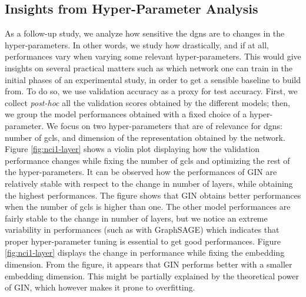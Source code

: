 \subsection{Insights from Hyper-Parameter Analysis}
As a follow-up study, we analyze how sensitive the \glspl{dgn} are to changes in the hyper-parameters. In other words, we study how drastically, and if at all, performances vary when varying some relevant hyper-parameters. This would give insights on several practical matters such as which network one can train in the initial phases of an experimental study, in order to get a sensible baseline to build from. To do so, we use validation accuracy as a proxy for test accuracy. First, we collect \emph{post-hoc} all the validation scores obtained by the different models; then, we group the model performances obtained with a fixed choice of a hyper-parameter. We focus on two hyper-parameters that are of relevance for \glspl{dgn}: number of \glspl{gcl}, and dimension of the representation obtained by the network. Figure \ref{fig:nci1-layer} shows a violin plot displaying how the validation performance changes while fixing the number of \glspl{gcl} and optimizing the rest of the hyper-parameters. It can be observed how the performances of GIN are relatively stable with respect to the change in number of layers, while obtaining the highest performances. The figure shows that GIN obtains better performances when the number of \glspl{gcl} is higher than one. The other model performances are fairly stable to the change in number of layers, but we notice an extreme variability in performances (such as with GraphSAGE) which indicates that proper hyper-parameter tuning is essential to get good performances. Figure \ref{fig:nci1-layer} displays the change in performance while fixing the embedding dimension.  From the figure, it appears that GIN performs better with a smaller embedding dimension. This might be partially explained by the theoretical power of GIN, which however makes it prone to overfitting.


